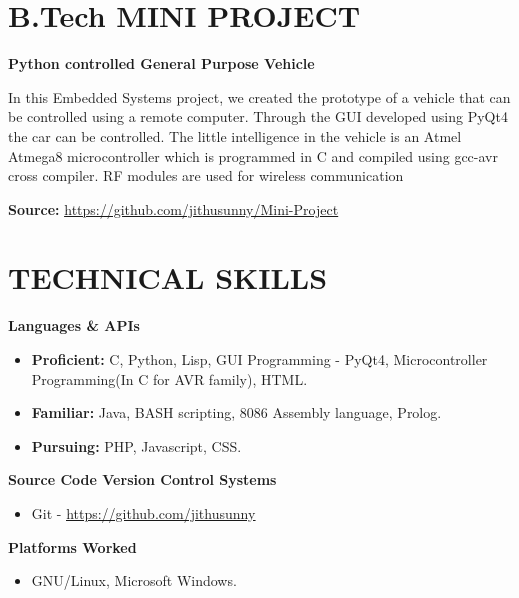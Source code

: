 \begin{resume}
\vspace*{+3.5mm}

\section{\sc \bf \textsf{B.Tech MINI PROJECT}}
{\bf \textsf{Python controlled General Purpose Vehicle}}\\
\vspace*{-.1in}

\begin{list1}
\item[] In this Embedded Systems project, we created the prototype of a vehicle that can be controlled using a remote computer. Through the GUI developed using PyQt4 the car can be controlled. The little intelligence in the vehicle is an Atmel Atmega8 microcontroller which is programmed in C and compiled using gcc-avr cross compiler. RF modules are used for wireless communication
\\
\item[] \textbf{Source:} \href{https://github.com/jithusunny/Mini-Project}{\underline{https://github.com/jithusunny/Mini-Project}}
\end{list1}


\vspace*{+3.5mm}
 \section{\sc \bf \textsf{TECHNICAL SKILLS}}
\textbf{Languages \& APIs}
\begin{itemize}
\item \textbf{Proficient:} C, Python, Lisp, GUI Programming - PyQt4, Microcontroller Programming(In C for AVR family), HTML.
\item \textbf{Familiar:} Java, BASH scripting, 8086 Assembly language, Prolog.
\item \textbf{Pursuing:} PHP, Javascript, CSS.
\end{itemize}

\textbf{Source Code Version Control Systems}
\begin{itemize}
\item Git - \href{https://github.com/jithusunny}{\underline{https://github.com/jithusunny}}
\end{itemize}

\textbf{Platforms Worked}
\begin{itemize}
\item GNU/Linux, Microsoft Windows.
\end{itemize}


\end{resume}
